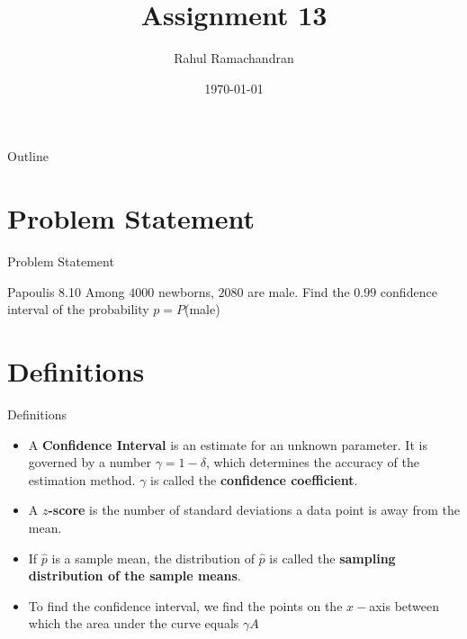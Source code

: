 \documentclass{beamer}
\title{Assignment 13}
\author{Rahul Ramachandran}
\date{\today}
\begin{document}
\begin{frame}
    \titlepage 
\end{frame}

\logo{}


\begin{frame}{Outline}
    \tableofcontents
\end{frame}



\section{Problem Statement}
\begin{frame}{Problem Statement}
    \begin{block}{Papoulis 8.10} Among $4000$ newborns, $2080$ are male. Find the $0.99$ confidence interval of the probability
$p = P$(male) \end{block}
\end{frame}

\section{Definitions}
\begin{frame}{Definitions}

\begin{itemize}
    \item A \textbf{Confidence Interval} is an estimate for an unknown parameter. It is governed by a number $\gamma = 1 - \delta$, which determines the accuracy of the estimation method. $\gamma$ is called the \textbf{confidence coefficient}.
    \item A \textbf{$z$-score} is the number of standard deviations a data point is away from the mean.
    \item If $\hat{p}$ is a sample mean, the distribution of $\hat{p}$ is called the \textbf{sampling distribution of the sample means}.
    \item To find the confidence interval, we find the points on the $x-$axis between which the area under the curve equals $\gamma A$
\end{itemize}


    
\end{frame}
\end{document}

